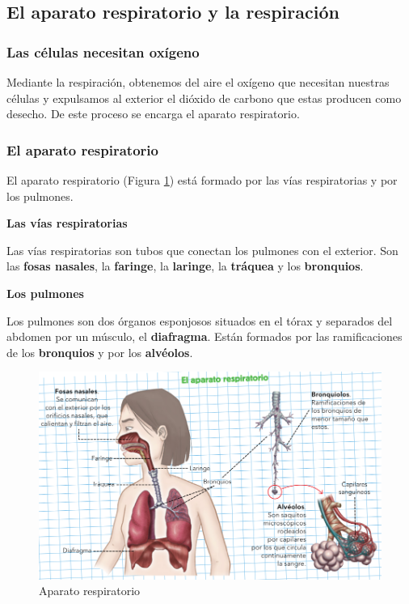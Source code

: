\subsection{El aparato respiratorio y la respiración}

\subsubsection{Las células necesitan oxígeno}

Mediante la respiración, obtenemos del aire el oxígeno que necesitan nuestras células y expulsamos al exterior el dióxido de carbono que estas producen como desecho. De este proceso se encarga el aparato respiratorio.

\subsubsection{El aparato respiratorio}

El aparato respiratorio (Figura \ref{fig:aparato-respiratorio}) está formado por las vías respiratorias y por los pulmones.

\vspace{3mm}
\textbf{Las vías respiratorias}

\vspace{3mm}
Las vías respiratorias son tubos que conectan los pulmones con el exterior. Son las \textbf{fosas nasales}, la \textbf{faringe}, la \textbf{laringe}, la \textbf{tráquea} y los \textbf{bronquios}.

\vspace{3mm}
\textbf{Los pulmones}

\vspace{3mm}
Los pulmones son dos órganos esponjosos situados en el tórax y separados del abdomen por un músculo, el \textbf{diafragma}. Están formados por las ramificaciones de los \textbf{bronquios} y por los \textbf{alvéolos}.

\begin{figure}[!ht]
    \centering
    \includegraphics[width=0.9\linewidth]{Tema3/04_Aparato_respiratorio.png}
    \caption{Aparato respiratorio}
    \label{fig:aparato-respiratorio}
\end{figure}

